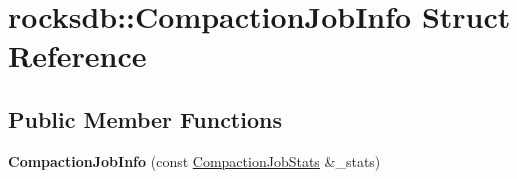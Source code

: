 \hypertarget{structrocksdb_1_1CompactionJobInfo}{}\section{rocksdb\+:\+:Compaction\+Job\+Info Struct Reference}
\label{structrocksdb_1_1CompactionJobInfo}
\subsection*{Public Member Functions}
\begin{DoxyCompactItemize}
\item 
{\bfseries Compaction\+Job\+Info} (const \hyperlink{structrocksdb_1_1CompactionJobStats}{Compaction\+Job\+Stats} \&\+\_\+stats)\hypertarget{structrocksdb_1_1CompactionJobInfo_a8d54f1c4b1aee7a12c32fd7beab9f1ef}{}\label{structrocksdb_1_1CompactionJobInfo_a8d54f1c4b1aee7a12c32fd7beab9f1ef}

\end{DoxyCompactItemize}

